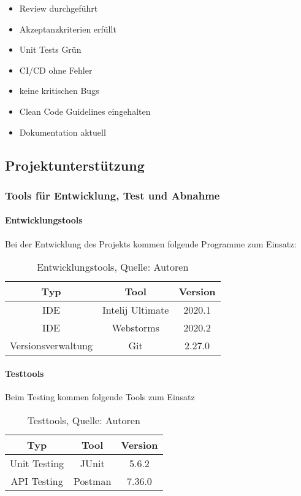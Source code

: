 \begin{itemize}
\item Review durchgeführt
\item Akzeptanzkriterien erfüllt
\item Unit Tests Grün
\item CI/CD ohne Fehler
\item keine kritischen Bugs
\item Clean Code Guidelines eingehalten
\item Dokumentation aktuell
\end{itemize}
\newpage
\subsection{Projektunterst\"utzung}
\subsubsection{Tools f\"ur Entwicklung, Test und Abnahme}
\paragraph{Entwicklungstools}
Bei der Entwicklung des Projekts kommen folgende Programme zum Einsatz: 

\begin{table}[H]
\setlength\extrarowheight{2pt} %
\begin{tabularx}{\textwidth}{|C|C|C|}
\hline
\textbf{Typ} &\textbf{Tool} & \textbf{Version}  \\

\hline
IDE & Intelij Ultimate  & 2020.1\\
\hline
IDE & Webstorms & 2020.2\\ 
\hline
Versionsverwaltung & Git & 2.27.0\\
\hline
\end{tabularx}
\caption{ \label{tbl: Entwicklungstools}Entwicklungstools, Quelle: Autoren}
\end{table}
\paragraph{Testtools}
Beim Testing kommen folgende Tools zum Einsatz

\begin{table}[H]
\setlength\extrarowheight{2pt} %
\begin{tabularx}{\textwidth}{|C|C|C|}
\hline
\textbf{Typ} &\textbf{Tool} & \textbf{Version}  \\
\hline
Unit Testing & JUnit  & 5.6.2\\
\hline 
API Testing & Postman & 7.36.0\\
\hline
\end{tabularx}
\caption{ \label{tbl: Testtools}Testtools, Quelle: Autoren}
\end{table}
